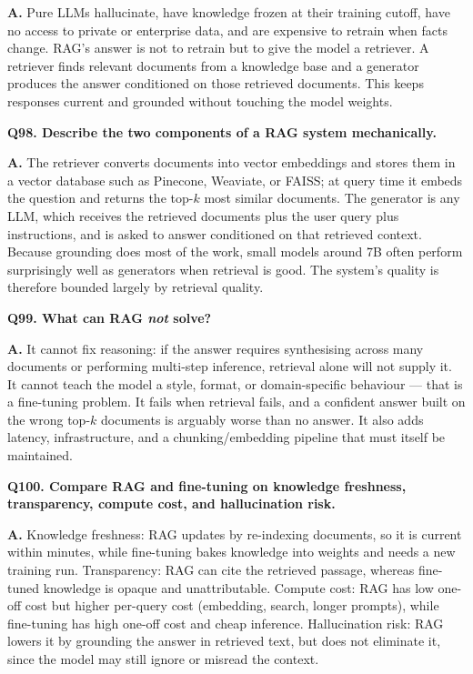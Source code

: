 \documentclass[11pt]{article}
\begin{document}
\noindent\textbf{A.} Pure LLMs hallucinate, have knowledge frozen at their training cutoff, have no access to private or enterprise data, and are expensive to retrain when facts change. RAG's answer is not to retrain but to give the model a retriever. A retriever finds relevant documents from a knowledge base and a generator produces the answer conditioned on those retrieved documents. This keeps responses current and grounded without touching the model weights.

\medskip
\noindent\textbf{Q98. Describe the two components of a RAG system mechanically.}

\noindent\textbf{A.} The retriever converts documents into vector embeddings and stores them in a vector database such as Pinecone, Weaviate, or FAISS; at query time it embeds the question and returns the top-$k$ most similar documents. The generator is any LLM, which receives the retrieved documents plus the user query plus instructions, and is asked to answer conditioned on that retrieved context. Because grounding does most of the work, small models around 7B often perform surprisingly well as generators when retrieval is good. The system's quality is therefore bounded largely by retrieval quality.

\medskip
\noindent\textbf{Q99. What can RAG \emph{not} solve?}

\noindent\textbf{A.} It cannot fix reasoning: if the answer requires synthesising across many documents or performing multi-step inference, retrieval alone will not supply it. It cannot teach the model a style, format, or domain-specific behaviour --- that is a fine-tuning problem. It fails when retrieval fails, and a confident answer built on the wrong top-$k$ documents is arguably worse than no answer. It also adds latency, infrastructure, and a chunking/embedding pipeline that must itself be maintained.

\medskip
\noindent\textbf{Q100. Compare RAG and fine-tuning on knowledge freshness, transparency, compute cost, and hallucination risk.}

\noindent\textbf{A.} Knowledge freshness: RAG updates by re-indexing documents, so it is current within minutes, while fine-tuning bakes knowledge into weights and needs a new training run. Transparency: RAG can cite the retrieved passage, whereas fine-tuned knowledge is opaque and unattributable. Compute cost: RAG has low one-off cost but higher per-query cost (embedding, search, longer prompts), while fine-tuning has high one-off cost and cheap inference. Hallucination risk: RAG lowers it by grounding the answer in retrieved text, but does not eliminate it, since the model may still ignore or misread the context.
\end{document}
